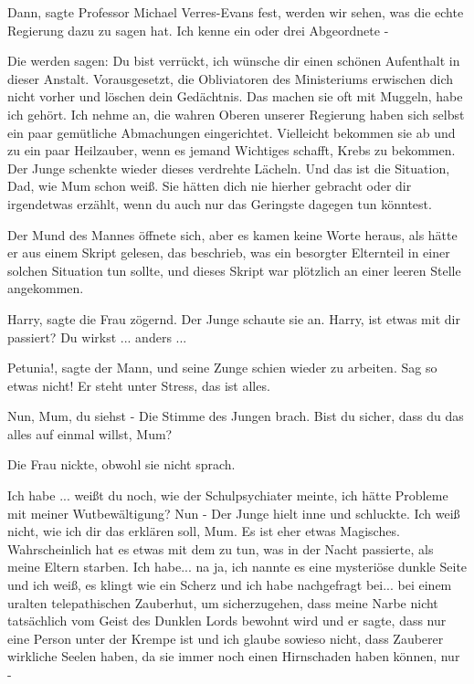 \glqq Dann\grqq{}, sagte Professor Michael Verres-Evans fest, \glqq werden wir
sehen, was die echte Regierung dazu zu sagen hat. Ich kenne ein oder drei
Abgeordnete -\grqq{}

\glqq Die werden sagen: Du bist verrückt, ich wünsche dir einen schönen
Aufenthalt in dieser Anstalt. Vorausgesetzt, die Obliviatoren des Ministeriums
erwischen dich nicht vorher und löschen dein Gedächtnis. Das machen sie oft mit
Muggeln, habe ich gehört. Ich nehme an, die wahren Oberen unserer Regierung
haben sich selbst ein paar gemütliche Abmachungen eingerichtet. Vielleicht
bekommen sie ab und zu ein paar Heilzauber, wenn es jemand Wichtiges schafft,
Krebs zu bekommen.\grqq{} Der Junge schenkte wieder dieses verdrehte Lächeln.
\glqq Und das ist die Situation, Dad, wie Mum schon weiß. Sie hätten dich nie
hierher gebracht oder dir irgendetwas erzählt, wenn du auch nur das Geringste
dagegen tun könntest.\grqq{}

Der Mund des Mannes öffnete sich, aber es kamen keine Worte heraus, als hätte er
aus einem Skript gelesen, das beschrieb, was ein besorgter Elternteil in einer
solchen Situation tun sollte, und dieses Skript war plötzlich an einer leeren
Stelle angekommen.

\glqq Harry\grqq{}, sagte die Frau zögernd. Der Junge schaute sie an. \glqq
Harry, ist etwas mit dir passiert? Du wirkst ... anders ...\grqq{}

\glqq Petunia!\grqq{}, sagte der Mann, und seine Zunge schien wieder zu
arbeiten. \glqq Sag so etwas nicht! Er steht unter Stress, das ist alles.\grqq{}

\glqq Nun, Mum, du siehst -\grqq{} Die Stimme des Jungen brach. \glqq Bist du
sicher, dass du das alles auf einmal willst, Mum?\grqq{}

Die Frau nickte, obwohl sie nicht sprach.

\glqq Ich habe ... weißt du noch, wie der Schulpsychiater meinte, ich hätte
Probleme mit meiner Wutbewältigung? Nun -\grqq{} Der Junge hielt inne und
schluckte. \glqq Ich weiß nicht, wie ich dir das erklären soll, Mum. Es ist eher
etwas Magisches. Wahrscheinlich hat es etwas mit dem zu tun, was in der Nacht
passierte, als meine Eltern starben. Ich habe... na ja, ich nannte es eine
mysteriöse dunkle Seite und ich weiß, es klingt wie ein Scherz und ich habe
nachgefragt bei... bei einem uralten telepathischen Zauberhut, um sicherzugehen,
dass meine Narbe nicht tatsächlich vom Geist des Dunklen Lords bewohnt wird und
er sagte, dass nur eine Person unter der Krempe ist und ich glaube sowieso
nicht, dass Zauberer wirkliche Seelen haben, da sie immer noch einen Hirnschaden
haben können, nur -\grqq{}

